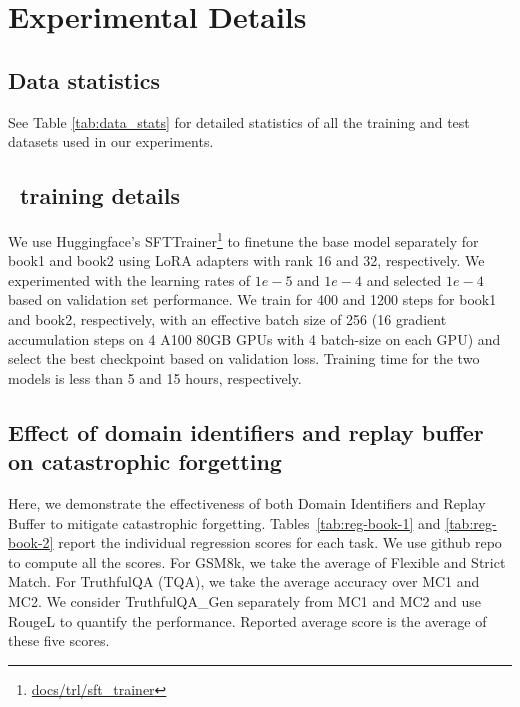 \onecolumn 
\section{Experimental Details}
\label{sec_appendix_expt}

\subsection{Data statistics}
\label{subsec:appendix_data_stats}

See Table \ref{tab:data_stats} for detailed statistics of all the training and test datasets used in our experiments.



\subsection{\ourmethodshort\ training details}
\label{subsec:appendix_training_details}
We use Huggingface's SFTTrainer\footnote{\href{https://huggingface.co/docs/trl/sft_trainer}{docs/trl/sft\_trainer}}
to finetune the base model separately for book1 and book2 using LoRA adapters with rank 16 and 32, respectively.
We experimented with the learning rates of $1e-5$ and $1e-4$ and selected $1e-4$ based on validation set performance. 
We train for 400 and 1200 steps for book1 and book2, respectively, with an effective batch size of 256 (16 gradient accumulation steps on 4 A100 80GB GPUs with 4 batch-size on each GPU) and select the best checkpoint based on validation loss. Training time for the two models is less than 5 and 15 hours, respectively. 


\subsection{Effect of domain identifiers and replay buffer on catastrophic forgetting}
\label{subsec:appendix_regression_scores}



Here, we demonstrate the effectiveness of both Domain Identifiers and Replay Buffer to mitigate catastrophic forgetting. 
Tables~\ref{tab:reg-book-1} and \ref{tab:reg-book-2} report the individual regression scores for each task. 
We use github repo\cite{eval-harness} to compute all the scores.
For GSM8k, we take the average of Flexible and Strict Match.
For TruthfulQA (TQA), we take the average accuracy over MC1 and MC2.
We consider TruthfulQA\_Gen separately from MC1 and MC2 and use RougeL to quantify the performance.
Reported average score is the average of these five scores.

